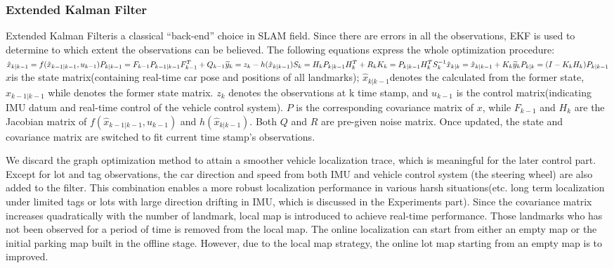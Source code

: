 \documentclass[journal]{IEEEtran}
\begin{document}
\subsubsection{Extended Kalman Filter}
Extended Kalman Filter\cite{Bailey2006Simultaneous}is a classical “back-end” choice in SLAM field. 
Since there are errors in all the observations, EKF is used to determine to which extent the observations can be believed. 
The following equations express the whole optimization procedure:
$
{\hat x}_{k|k-1}=f({\hat x}_{k-1|k-1},{u}_{k-1})\\
{P}_{k|k-1} = {F}_{k-1}{P}_{k-1|k-1}{F}_{k-1}^{T}+{Q}_{k-1}\\
\\
{\widetilde y}_{k}={z}_{k}-h({\hat x}_{k|k-1})\\
{S}_{k}={H}_{k}{P}_{k|k-1}{H}_{k}^{T}+{R}_{k}\\
{K}_{k}={P}_{k|k-1}{H}_{k}^{T}{S}_{k}^{-1}\\
{\hat x}_{k|k}={\hat x}_{k|k-1}+{K}_{k}{\widetilde y}_{k}\\
{P}_{k|k}=(I-{K}_{k}{H}_{k}){P}_{k|k-1}\\
$
\\
 $x$is the state matrix(containing real-time car pose and positions of all landmarks);  
 ${\hat x}_{k|k-1}$denotes the  calculated from the former state, ${\hat x}_{k-1|k-1}$ while denotes the former state matrix.  
 $z_k$ denotes the observations at k time stamp, 
 and $u_{k-1}$ is the control matrix(indicating IMU datum and real-time control of the vehicle control system). 
 $P$ is the corresponding covariance matrix of $x$, while $F_{k-1}$ and $H_k$ are the Jacobian matrix of $f({\hat x}_{k-1|k-1},{u}_{k-1})$ and $h({\hat x}_{k|k-1})$. 
 Both $Q$ and $R$ are pre-given noise matrix. Once updated, the state and covariance matrix are switched to fit current time stamp’s observations.

We discard the graph optimization method to attain a smoother vehicle localization trace, which is meaningful for the later control part. 
Except for lot and tag observations, the car direction and speed from both IMU and vehicle control system (the steering wheel) are also added to the filter. 
This combination enables a more robust localization performance in various harsh situations(etc. long term localization under limited tags or lots with large direction drifting in IMU, which is discussed in the Experiments part). 
Since the covariance matrix increases quadratically with the number of landmark\cite{Bailey2006Simultaneous}, local map is introduced to achieve real-time performance. 
Those landmarks who has not been observed for a period of time is removed from the local map. 
The online localization can start from either an empty map or the initial parking map built in the offline stage. 
However, due to the local map strategy, the online lot map starting from an empty map is to improved.
\end{document}

